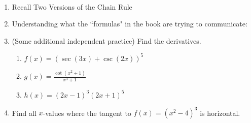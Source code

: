 \documentclass[11pt,fleqn]{article}
\begin{document}
\renewcommand{\headrulewidth}{0pt}
\newcommand{\blank}[1]{\rule{#1}{0.75pt}}
\newcommand{\bc}{\begin{center}}
\newcommand{\ec}{\end{center}}
\renewcommand{\d}{\displaystyle}

\vspace*{-0.7in}

\begin{center}
  \large
  \\
\end{center}
\begin{enumerate}
\item Recall Two Versions of the Chain Rule
\vspace{1in}
\item Understanding what the ``formulas" in the book are trying to communicate:
\vspace{2in}
\item (Some additional independent practice) Find the derivatives.
	\begin{enumerate}
	\item $f(x)=(\sec(3x)+\csc(2x))^5$
	\vfill
	\item $g(x)=\frac{\cot(x^2+1)}{x^3+1}$
	\vfill
	\item $h(x)=(2x-1)^3(2x+1)^5$
	\vfill
	\end{enumerate}
\item Find all $x$-values where the tangent to $f(x)=(x^2-4)^3$ is horizontal.
\vfill


%
\end{enumerate}
\end{document}
